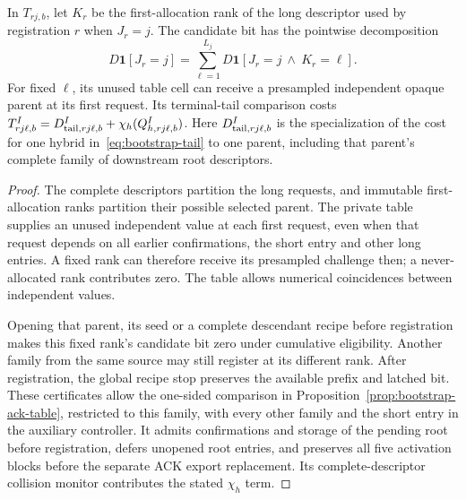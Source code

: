 \begin{lemma}
\label{lem:bootstrap-initial-allocation}
In $T_{rj,b}$, let $K_r$ be the first-allocation rank of the long
descriptor used by registration $r$ when $J_r=j$. The candidate bit
has the pointwise decomposition
\[
 D\mathbf1[J_r=j]=\sum_{\ell=1}^{L_j}
       D\mathbf1[J_r=j\ \land\ K_r=\ell].
\]
For fixed $\ell$, its unused table cell can receive a presampled
independent opaque parent at its first request. Its terminal-tail
comparison costs
$T^I_{rj\ell,b}=D^I_{{\rm tail},rj\ell,b}
                    +\chi_h(Q^I_{h,rj\ell,b})$.
Here $D^I_{{\rm tail},rj\ell,b}$ is the specialization of the cost for one
hybrid in~\eqref{eq:bootstrap-tail} to one parent, including that parent's
complete family of downstream root descriptors.
\end{lemma}
\begin{proof}
The complete descriptors partition the long requests, and immutable
first-allocation ranks partition their possible selected parent. The
private table supplies an unused independent value at each first request,
even when that request depends on all earlier confirmations, the short
entry and other long entries. A fixed rank can therefore receive its
presampled challenge then; a never-allocated rank contributes zero.
The table allows numerical coincidences between independent values.

Opening that parent, its seed or a complete descendant recipe before
registration makes this fixed rank's candidate bit zero under cumulative
eligibility. Another family from the same source may still register at
its different rank. After registration, the global recipe stop preserves
the available prefix and latched bit. These certificates allow the
one-sided comparison in Proposition~\ref{prop:bootstrap-ack-table},
restricted to this family, with every other family and the short entry in the auxiliary
controller. It admits confirmations and storage of the pending root before
registration, defers unopened root entries, and preserves all five
activation blocks before the separate ACK export replacement. Its
complete-descriptor collision monitor contributes the stated
$\chi_h$ term.
\end{proof}

